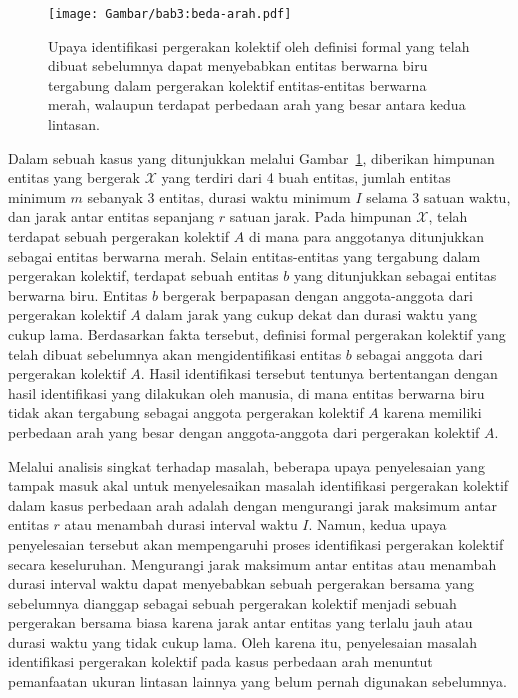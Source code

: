 \begin{figure}[h]
    \centering
    \captionsetup{width=0.8\textwidth}
    \texttt{[image: Gambar/bab3:beda-arah.pdf]}
    \caption[Masalah identifikasi pada kasus perbedaan arah]{Upaya identifikasi pergerakan kolektif oleh definisi formal yang telah dibuat sebelumnya dapat menyebabkan entitas berwarna biru tergabung dalam pergerakan kolektif entitas-entitas berwarna merah, walaupun terdapat perbedaan arah yang besar antara kedua lintasan.}
    \label{bab3:masalah-arah}
\end{figure}
    
Dalam sebuah kasus yang ditunjukkan melalui Gambar~\ref{bab3:masalah-arah}, diberikan himpunan entitas yang bergerak $\mathcal{X}$ yang terdiri dari 4 buah entitas, jumlah entitas minimum $m$ sebanyak $3$ entitas, durasi waktu minimum $I$ selama $3$ satuan waktu, dan jarak antar entitas sepanjang $r$ satuan jarak. Pada himpunan $\mathcal{X}$, telah terdapat sebuah pergerakan kolektif $A$ di mana para anggotanya ditunjukkan sebagai entitas berwarna merah. Selain entitas-entitas yang tergabung dalam pergerakan kolektif, terdapat sebuah entitas $b$ yang ditunjukkan sebagai entitas berwarna biru. Entitas $b$ bergerak berpapasan dengan anggota-anggota dari pergerakan kolektif $A$ dalam jarak yang cukup dekat dan durasi waktu yang cukup lama. Berdasarkan fakta tersebut, definisi formal pergerakan kolektif yang telah dibuat sebelumnya akan mengidentifikasi entitas $b$ sebagai anggota dari pergerakan kolektif $A$. Hasil identifikasi tersebut tentunya bertentangan dengan hasil identifikasi yang dilakukan oleh manusia, di mana entitas berwarna biru tidak akan tergabung sebagai anggota pergerakan kolektif $A$ karena memiliki perbedaan arah yang besar dengan anggota-anggota dari pergerakan kolektif $A$.
    
Melalui analisis singkat terhadap masalah, beberapa upaya penyelesaian yang tampak masuk akal untuk menyelesaikan masalah identifikasi pergerakan kolektif dalam kasus perbedaan arah adalah dengan mengurangi jarak maksimum antar entitas $r$ atau menambah durasi interval waktu $I$. Namun, kedua upaya penyelesaian tersebut akan mempengaruhi proses identifikasi pergerakan kolektif secara keseluruhan. Mengurangi jarak maksimum antar entitas atau menambah durasi interval waktu dapat menyebabkan sebuah pergerakan bersama yang sebelumnya dianggap sebagai sebuah pergerakan kolektif menjadi sebuah pergerakan bersama biasa karena jarak antar entitas yang terlalu jauh atau durasi waktu yang tidak cukup lama. Oleh karena itu, penyelesaian masalah identifikasi pergerakan kolektif pada kasus perbedaan arah menuntut pemanfaatan ukuran lintasan lainnya yang belum pernah digunakan sebelumnya.
    
